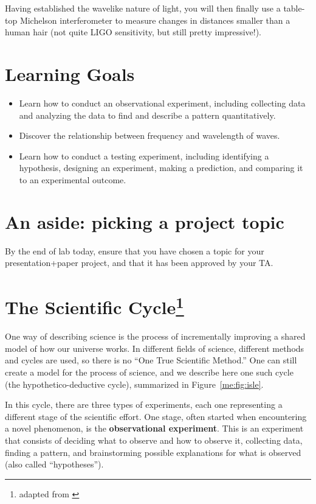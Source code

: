 Having established the wavelike nature of light, you will then finally use a table-top Michelson interferometer to measure changes in distances smaller than a human hair (not quite LIGO sensitivity, but still pretty impressive!).

\section{Learning Goals}

\begin{itemize}
	\item Learn how to conduct an observational experiment, including collecting data and analyzing the data to find and describe a pattern quantitatively.
	
	\item Discover the relationship between frequency and wavelength of waves.
	
	\item Learn how to conduct a testing experiment, including identifying a hypothesis, designing an experiment, making a prediction, and comparing it to an experimental outcome.
\end{itemize}

\section{An aside: picking a project topic}

By the end of lab today, ensure that you have chosen a topic for your presentation+paper project, and that it has been approved by your TA.

\section{The Scientific Cycle\protect\footnote{adapted from \cite{etkina_college_2014}}}

One way of describing science is the process of incrementally improving a shared model of how our universe works. In different fields of science, different methods and cycles are used, so there is no ``One True Scientific Method.'' One can still create a model for the process of science, and we describe here one such cycle (the hypothetico-deductive cycle), summarized in Figure~\ref{me:fig:isle}.

In this cycle, there are three types of experiments, each one representing a different stage of the scientific effort. One stage, often started when encountering a novel phenomenon, is the \textbf{observational experiment}. This is an experiment that consists of deciding what to observe and how to observe it, collecting data, finding a pattern, and brainstorming possible explanations for what is observed (also called ``hypotheses'').

